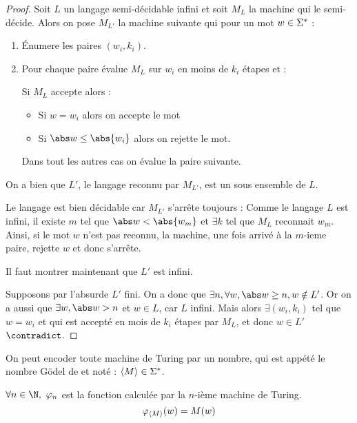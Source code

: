 \begin{proof}
	Soit $L$ un langage semi-décidable infini et soit $M_L$ la machine qui le semi-décide. Alors
	on pose $M_{L'}$ la machine suivante qui pour un mot $w \in \Sigma^{*}$ :
	\begin{enumerate}
		\item Énumere les paires $(w_i,k_i)$.
		\item Pour chaque paire évalue $M_L$ sur $w_i$ en moins de $k_i$ étapes et :

		      Si $M_L$ accepte alors :
		      \begin{itemize}
			      \item Si $w = w_i$ alors on accepte le mot
			      \item Si $\abs w \leq \abs {w_i}$ alors on rejette le mot.
		      \end{itemize}
		      Dans tout les autres cas on évalue la paire suivante.
	\end{enumerate}
	On a bien que $L'$, le langage reconnu par $M_{L'}$, est un sous ensemble de $L$.

	Le langage est bien décidable car $M_{L'}$ s'arrête toujours : Comme le langage $L$ est infini, il existe
	$m$ tel que $\abs w < \abs {w_m}$ et $\exists k$ tel que $M_L$ reconnait $w_m$. Ainsi, si le mot $w$ n'est pas reconnu,
	la machine, une fois arrivé à la $m$-ieme paire, rejette $w$ et donc s'arrête.

	Il faut montrer maintenant que $L'$ est infini.

	Supposons par l'absurde $L'$ fini. On a donc que $\exists n, \forall w, \abs w \geq n, w \notin L'$.
	Or on a aussi que $\exists w, \abs w > n$ et $w \in L$, car $L$ infini. Mais alors $\exists (w_i,k_i)$ tel que $w = w_i$ et qui est
	accepté en mois de $k_i$ étapes par $M_L$, et donc $w \in L'$ $\contradict$.
\end{proof}

\begin{definition}
	On peut encoder toute machine de Turing par un nombre, qui est appété
	le nombre Gödel de et noté : $\left\langle M\right\rangle \in \Sigma^{*}$.
\end{definition}



\begin{definition} \label{def:enum}
	$\forall n \in \N, \ \phi_n$ est la fonction calculée par la $n$-ième machine de Turing.
	$$\varphi_{\left\langle M\right\rangle} (w) = M (w)$$
\end{definition}


